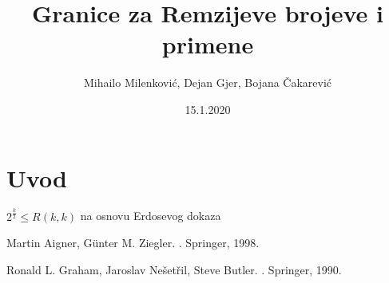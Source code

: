 \documentclass{article}
\title{Granice za Remzijeve brojeve i primene}
\date{15.1.2020}
\author{Mihailo Milenković, Dejan Gjer, Bojana Čakarević}
\begin{document}
	
	\maketitle
	
	\newpage
	
	\tableofcontents
	
	\newpage
	
	\section{Uvod}
	
	$ 2^{\frac{k}{2}} \leq R(k,k)$ na osnovu Erdosevog dokaza \cite{theBook}
	
	\lipsum[1]

	\newpage
	
\begin{thebibliography}{99}
	Martin Aigner, Günter M. Ziegler.
	.
	\newblock Springer, 1998.
	
	Ronald L. Graham, Jaroslav Nešetřil, Steve Butler.
	.
	\newblock Springer, 1990.
	
\end{thebibliography}	
	
\end{document}
